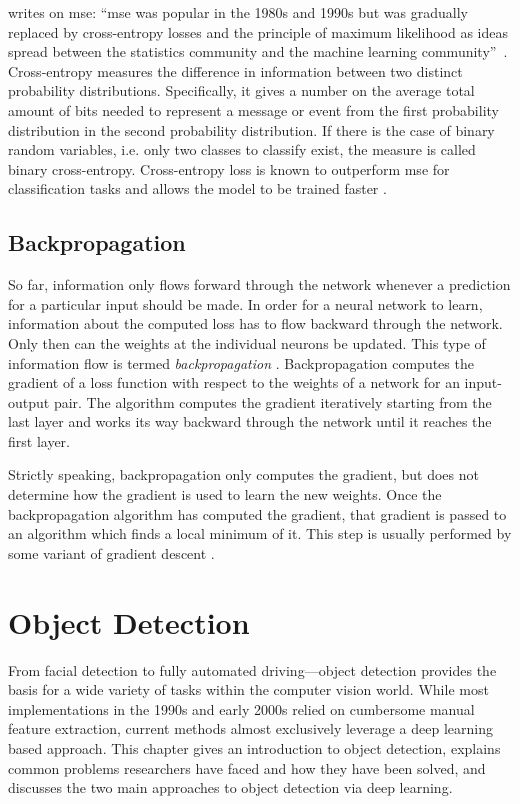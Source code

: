 \documentclass[draft,final]{vutinfth} %
\begin{document}
\textcite{goodfellow2016} writes on \gls{mse}: ``\gls{mse} was popular
in the 1980s and 1990s but was gradually replaced by cross-entropy
losses and the principle of maximum likelihood as ideas spread between
the statistics community and the machine learning
community''~\cite[p.222]{goodfellow2016}. Cross-entropy measures the
difference in information between two distinct probability
distributions. Specifically, it gives a number on the average total
amount of bits needed to represent a message or event from the first
probability distribution in the second probability distribution. If
there is the case of binary random variables, i.e. only two classes to
classify exist, the measure is called binary
cross-entropy. Cross-entropy loss is known to outperform \gls{mse} for
classification tasks and allows the model to be trained
faster \cite{simard2003}.

\subsection{Backpropagation}
\label{ssec:theory-backprop}

So far, information only flows forward through the network whenever a
prediction for a particular input should be made. In order for a
neural network to learn, information about the computed loss has to
flow backward through the network. Only then can the weights at the
individual neurons be updated. This type of information flow is termed
\emph{backpropagation} \cite{rumelhart1986}. Backpropagation computes
the gradient of a loss function with respect to the weights of a
network for an input-output pair. The algorithm computes the gradient
iteratively starting from the last layer and works its way backward
through the network until it reaches the first layer.

Strictly speaking, backpropagation only computes the gradient, but
does not determine how the gradient is used to learn the new
weights. Once the backpropagation algorithm has computed the gradient,
that gradient is passed to an algorithm which finds a local minimum of
it. This step is usually performed by some variant of gradient descent
\cite{cauchy1847}.

\section{Object Detection}
\label{sec:background-detection}

From facial detection to fully automated driving—object detection
provides the basis for a wide variety of tasks within the computer
vision world. While most implementations in the 1990s and early 2000s
relied on cumbersome manual feature extraction, current methods almost
exclusively leverage a deep learning based approach. This chapter
gives an introduction to object detection, explains common problems
researchers have faced and how they have been solved, and discusses
the two main approaches to object detection via deep learning.
\end{document}
